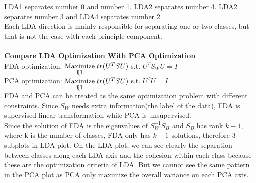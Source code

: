 \documentclass[12pt]{article}
\begin{document}
\noindent
LDA1 separates number 0 and number 1. LDA2 separates number 4. LDA2 separates number 3 and LDA4 separates number 2.\\
Each LDA direction is mainly responsible for separating one or two classes, but that is not the case with each principle component.\\\\
\textbf{Compare LDA Optimization With PCA Optimization}\\
FDA optimization: $\stackunder{Maximize}{\textbf{U}}\;tr(U^TSU)$ s.t. $U^TS_WU=I$\\
PCA optimization: $\stackunder{Maximize}{\textbf{U}}\;tr(U^TSU)$ s.t. $U^TU=I$\\
FDA and PCA can be treated as the same optimization problem with different constraints. Since $S_W$ needs extra information(the label of the data), FDA is supervised linear transformation while PCA is unsupervised.\\
Since the solution of FDA is the eigenvalues of $S_W^{-1}S_B$ and $S_B$ has rank $k-1$, where k is the number of classes, FDA only has $k-1$ solutions, therefore 3 subplots in LDA plot. On the LDA plot, we can see clearly the separation between classes along each LDA axis and the cohesion within each class because these are the optimization criteria of LDA. But we cannot see the same pattern in the PCA plot as PCA only maximize the overall variance on each PCA axis.
\end{document}
